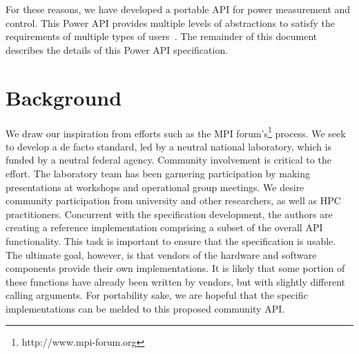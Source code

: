 \documentclass[12pt]{report} %
\begin{document}
For these reasons, we have developed a portable API for power measurement and control.  
This Power API provides multiple levels of abstractions to satisfy the requirements of multiple types of users~\cite{Laros:2013:PwrUseCase}.
The remainder of this document describes the details of this Power API specification.


\section{Background}\label{sec:Background}
We draw our inspiration from efforts such as the MPI forum's\footnote{http://www.mpi-forum.org} process. 
We seek to develop a de facto standard, led by a neutral national laboratory, which is funded by a neutral federal agency.
Community involvement is critical to the effort.
The laboratory team has been garnering participation by making presentations at workshops and operational group meetings. 
We desire community participation from university and other researchers, as well as HPC practitioners. 
Concurrent with the specification development, the authors are creating a reference implementation comprising a subset of the overall API functionality. 
This task is important to ensure that the specification is usable. 
The ultimate goal, however, is that vendors of the hardware and software components provide their own implementations. 
It is likely that some portion of these functions have already been written by vendors, but with slightly different calling arguments.
For portability sake, we are hopeful that the specific implementations can be melded to this proposed community API.
\end{document}
